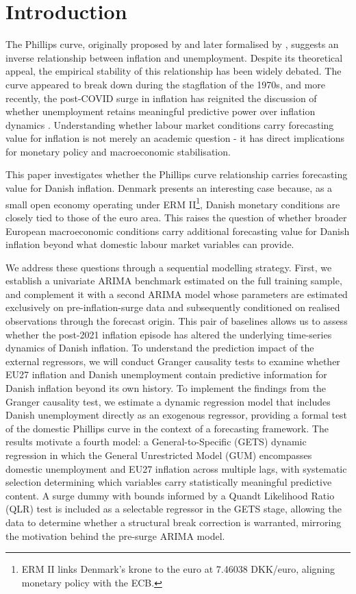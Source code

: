 \chapter{Introduction}\label{sec:introduction}
The Phillips curve, originally proposed by \textcite{phillips1958} and later 
formalised by \textcite{samuelson1960}, suggests an inverse relationship 
between inflation and unemployment. Despite its theoretical appeal, the 
empirical stability of this relationship has been widely debated. The curve 
appeared to break down during the stagflation of the 1970s, and more recently, 
the post-COVID surge in inflation has reignited the discussion of whether 
unemployment retains meaningful predictive power over inflation dynamics 
\parencite{stock2019}. Understanding whether labour market conditions carry 
forecasting value for inflation is not merely an academic question - it has 
direct implications for monetary policy and macroeconomic stabilisation.

This paper investigates whether the Phillips curve relationship carries forecasting value for Danish inflation. Denmark presents an interesting case because, as a small open economy operating under ERM II\footnote{ERM II links Denmark's krone to the euro at 7.46038 DKK/euro, aligning monetary policy with the ECB.}, Danish monetary conditions are closely tied to those of the euro area. This raises the question of whether broader European macroeconomic conditions carry additional forecasting value for Danish inflation beyond what domestic labour market variables can provide.

We address these questions through a sequential modelling strategy. First, we establish a univariate ARIMA benchmark estimated on the full training sample, 
and complement it with a second ARIMA model whose parameters are estimated 
exclusively on pre-inflation-surge data and subsequently conditioned on realised 
observations through the forecast origin. This pair of baselines allows us to 
assess whether the post-2021 inflation episode has altered the underlying 
time-series dynamics of Danish inflation. To understand the prediction impact of the external regressors, we will conduct Granger causality tests to examine 
whether EU27 inflation and Danish unemployment contain predictive information for Danish inflation beyond its own history. To implement the findings from the Granger causality test, we estimate a dynamic regression model that includes Danish unemployment directly as an exogenous regressor, providing a formal test of the domestic Phillips curve in the context of a forecasting framework. The results motivate a fourth model: a General-to-Specific (GETS) dynamic regression in which the General Unrestricted Model (GUM) encompasses domestic unemployment and EU27 inflation across multiple lags, with systematic selection determining which variables carry statistically meaningful predictive content. A surge dummy with bounds informed by a Quandt Likelihood Ratio (QLR) test is included as a selectable regressor in the GETS stage, allowing the data to determine whether a structural break correction is warranted, mirroring the motivation behind the pre-surge ARIMA model.


